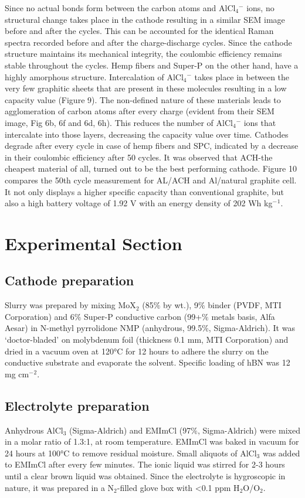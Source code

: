 \documentclass{article}
\begin{document}
Since no actual bonds form between the carbon atoms and AlCl$_4{^-}$ ions, no structural change takes place in the cathode resulting in a similar SEM image before and after the cycles. This can be accounted for the identical Raman spectra recorded before and after the charge-discharge cycles.  Since the cathode structure maintains its mechanical integrity, the coulombic efficiency remains stable throughout the cycles. Hemp fibers and Super-P on the other hand, have a highly amorphous structure. Intercalation of AlCl$_4{^-}$ takes place in between the very few graphitic sheets that are present in these molecules resulting in a low capacity value (Figure 9). The non-defined nature of these materials leads to agglomeration of carbon atoms after every charge (evident from their SEM image, Fig 6b, 6f and 6d, 6h). This reduces the number of AlCl$_4{^-}$ ions that intercalate into those layers, decreasing the capacity value over time. Cathodes degrade after every cycle in case of hemp fibers and SPC, indicated by a decrease in their coulombic efficiency after 50 cycles.  It was observed that ACH-the cheapest material of all, turned out to be the best performing cathode. Figure 10 compares the 50th cycle measurement for AL/ACH and Al/natural graphite cell. It not only displays a higher specific capacity than conventional graphite, but also a high battery voltage of 1.92 V with an energy density of 202 Wh kg$^-{^1}$. 


\section{Experimental Section}
\subsection{Cathode preparation}
Slurry was prepared by mixing MoX$_2$ (85$\%$ by wt.), 9$\%$ binder (PVDF, MTI Corporation) and 6$\%$ Super-P conductive carbon (99+$\%$ metals basis, Alfa Aesar) in N-methyl pyrrolidone NMP (anhydrous, 99.5$\%$, Sigma-Aldrich). It was ‘doctor-bladed’ on molybdenum foil (thickness 0.1 mm, MTI Corporation) and dried in a vacuum oven at 120°C for 12 hours to adhere the slurry on the conductive substrate and evaporate the solvent. Specific loading of hBN was 12 mg cm$^-{^2}$. 
\subsection{Electrolyte preparation}
Anhydrous AlCl$_3$ (Sigma-Aldrich) and EMImCl (97$\%$, Sigma-Aldrich) were mixed in a molar ratio of 1.3:1, at room temperature. EMImCl was baked in vacuum for 24 hours at 100°C to remove residual moisture. Small aliquots of AlCl$_3$ was added to EMImCl after every few minutes. The ionic liquid was stirred for 2-3 hours until a clear brown liquid was obtained. Since the electrolyte is hygroscopic in nature, it was prepared in a N$_2$-filled glove box with <0.1 ppm H$_2$O/O$_2$. 
\end{document}
